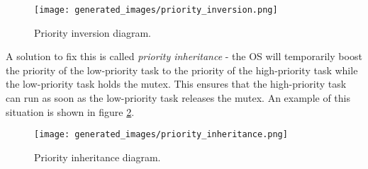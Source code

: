 \documentclass[main.tex]{subfiles}
\begin{document}
\begin{figure}[H]
    \centering
    \texttt{[image: generated\_images/priority\_inversion.png]}
    \caption{Priority inversion diagram.}
    \label{fig:priority_inversion}
\end{figure}

A solution to fix this is called \textit{priority inheritance} - the OS will temporarily boost the priority of the low-priority task to the priority of the high-priority task while the low-priority task holds the mutex. This ensures that the high-priority task can run as soon as the low-priority task releases the mutex. An example of this situation is shown in figure \ref{fig:priority_inheritance}.

\begin{figure}[H]
    \centering
    \texttt{[image: generated\_images/priority\_inheritance.png]}
    \caption{Priority inheritance diagram.}
    \label{fig:priority_inheritance}
\end{figure}
\end{document}
